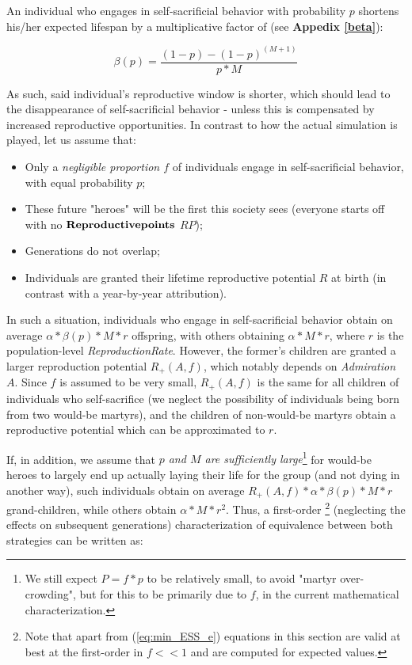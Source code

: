\documentclass[a4paper,12pt]{report}
\begin{document}
An individual who engages in self-sacrificial behavior with probability $p$
 shortens his/her expected lifespan by a multiplicative factor of (see \textbf{Appedix \ref{beta}}):
 
\begin{equation}
 \beta(p) = \frac{(1-p) - (1-p)^{(M+1)}}{p*M} 
\label{eq_beta}
\end{equation}

As such, said individual's reproductive window is shorter, which should lead to the disappearance of
 self-sacrificial behavior - unless this is compensated by increased reproductive opportunities. In contrast to how the
 actual simulation is played, let us assume that: 
 \begin{itemize}
\item Only a \textit{negligible proportion $f$} of individuals engage in self-sacrificial behavior, with equal probability $p$;
\item These future "heroes" will be the first this society sees (everyone starts off with no $\bf{Reproductive points}$ $RP$);
\item Generations do not overlap;
\item Individuals are granted their lifetime reproductive potential $R$ at birth
(in contrast with a year-by-year attribution).
\end{itemize}
 
In such a situation, individuals who engage in self-sacrificial behavior obtain on average $\alpha*\beta(p)*M*r$ offspring, 
with others obtaining $\alpha*M*r$, where $r$ is the population-level \emph{ReproductionRate}. However,
the former's children are granted a larger reproduction potential $R_+(A,f)$, which notably
depends on \emph{Admiration} $A$. Since $f$ is assumed to be very small, $R_+(A,f)$ is the same for all
children of individuals who self-sacrifice (we neglect the possibility of individuals being born from two
would-be martyrs), and the children of non-would-be martyrs obtain a reproductive potential which can be
approximated to $r$.

If, in addition, we assume that \emph{$p$ and $M$ are sufficiently large}\footnote{We still expect
$P=f*p$ to be relatively small, to avoid "martyr over-crowding",
but for this to be primarily due to $f$, in the current mathematical characterization.}
for would-be heroes to largely end up
actually laying their life for the group (and not dying in another way), such individuals obtain 
on average $R_+(A,f)*\alpha*\beta(p)*M*r$ grand-children, 
while others obtain $\alpha*M*r^2$. Thus, a first-order
\footnote{Note that apart from (\ref{eq:min_ESS_e}) equations in this section are valid at best at the
first-order in $f<<1$ and are computed for expected values.}
(neglecting the effects on subsequent generations) characterization of equivalence between both strategies can be written as:
 
\end{document}
